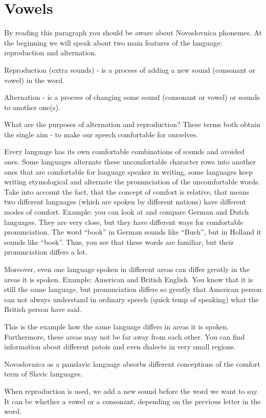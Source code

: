 \section{Vowels}

By reading this paragraph you should be aware about Novoslovnica phonemes. At the beginning we will speak about two main features of the language: reproduction and alternation.

Reproduction (extra sounds) - is a process of adding a new sound (consonant or vowel) in the word.

Alternation - is a process of changing some sound (consonant or vowel) or sounds to another one(s).

What are the purposes of alternation and reproduction? These terms both obtain the single aim - to make our speech comfortable for ourselves.

Every language has its own comfortable combinations of sounds and avoided ones. Some languages alternate these uncomfortable character rows into another ones that are comfortable for language speaker in writing, some languages keep writing etymological and alternate the pronunciation of the uncomfortable words. Take into account the fact, that the concept of comfort is relative, that means two different languages (which are spoken by different nations) have different modes of comfort.
Example: you can look at and compare German and Dutch languages. They are very close, but they have different ways for comfortable pronunciation. The word “book” in German sounds like “Buch”, but in Holland it sounds like “boek”. Thus, you see that these words are familiar, but their pronunciation differs a lot.

Moreover, even one language spoken in different areas can differ greatly in the areas it is spoken.
Example: American and British English. You know that it is still the same language, but pronunciation differs so greatly that American person can not always understand in ordinary speech (quick temp of speaking) what the British person have said.

This is the example how the same language differs in areas it is spoken. Furthermore, these areas may not be far away from each other. You can find information about different patois and even dialects in very small regions. 

Novoslovnica as a panslavic language absorbs different conceptions of the comfort term of Slavic languages.

When reproduction is used, we add a new sound before the word we want to say. It can be whether a vowel or a consonant, depending on the previous letter in the word.

